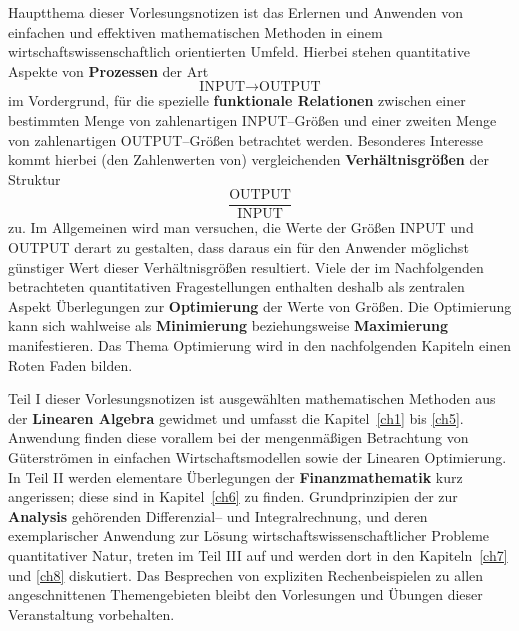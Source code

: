 \medskip
\noindent
Hauptthema dieser Vorlesungsnotizen ist das Erlernen und Anwenden
von einfachen und effektiven mathematischen Methoden in einem 
wirtschaftswissenschaftlich orientierten Umfeld. Hierbei stehen
quantitative Aspekte von {\bf Prozessen} der Art
%
\[
\text{INPUT} \rightarrow \text{OUTPUT}
\]
%
im Vordergrund, f\"ur die spezielle {\bf funktionale Relationen}
zwischen einer bestimmten Menge von zahlenartigen INPUT--Gr\"o\ss en
und einer zweiten Menge von zahlenartigen OUTPUT--Gr\"o\ss en
betrachtet werden. Besonderes Interesse kommt hierbei (den
Zahlenwerten von) vergleichenden {\bf Verh\"altnisgr\"o\ss en}
der Struktur
%
\[
\frac{\text{OUTPUT}}{\text{INPUT}}
\]
%
zu. Im Allgemeinen wird man versuchen, die Werte der Gr\"o\ss en
INPUT und OUTPUT derart zu gestalten, dass daraus ein
f\"ur den Anwender m\"oglichst g\"unstiger Wert dieser
Verh\"altnisgr\"o\ss en resultiert. Viele der im
Nachfolgenden betrachteten quantitativen Fragestellungen
enthalten deshalb als zentralen Aspekt \"Uberlegungen zur
{\bf Optimierung} der Werte von Gr\"o\ss en. Die Optimierung kann
sich wahlweise als {\bf Minimierung} beziehungsweise
{\bf Maximierung} manifestieren. Das Thema Optimierung wird in
den nachfolgenden Kapiteln
einen Roten Faden bilden.

\medskip
\noindent
Teil I dieser Vorlesungsnotizen ist ausgew\"ahlten mathematischen
Methoden aus der {\bf Linearen Algebra} gewidmet und umfasst die
Kapitel~\ref{ch1} bis \ref{ch5}. Anwendung finden diese vorallem
bei der mengenm\"a\ss igen Betrachtung von G\"uterstr\"omen in
einfachen Wirtschaftsmodellen sowie der Linearen Optimierung.
In Teil II werden elementare \"Uberlegungen der
{\bf Finanzmathematik} kurz angerissen; diese sind in
Kapitel~\ref{ch6} zu finden.
Grundprinzipien der zur {\bf Analysis} geh\"orenden
Differenzial-- und Integralrechnung, und deren exemplarischer
Anwendung zur L\"osung wirtschaftswissenschaftlicher Probleme
quantitativer Natur, treten im Teil III auf und werden dort in den
Kapiteln~\ref{ch7} und \ref{ch8} diskutiert. Das Besprechen von
expliziten Rechenbeispielen zu allen angeschnittenen Themengebieten
bleibt den Vorlesungen und \"Ubungen dieser Veranstaltung
vorbehalten.

